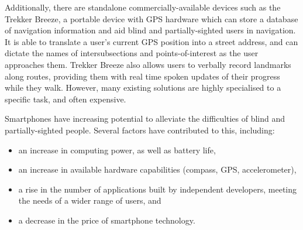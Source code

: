 \documentclass[10pt,twocolumn]{article}
\newcommand{\citep}[1]{}
\begin{document}
Additionally, there are standalone commercially-available devices such as the Trekker Breeze, a portable device with GPS hardware which can store a database of navigation information and aid blind and partially-sighted users in navigation\citep{trekker}. It is able to translate a user's current GPS position into a street address, and can dictate the names of intersubsections and points-of-interest as the user approaches them.  Trekker Breeze also allows users to verbally record landmarks along routes, providing them with real time spoken updates of their progress while they walk.  However, many existing solutions are highly specialised to a specific task, and often expensive. 

Smartphones have increasing potential to alleviate the difficulties of blind and partially-sighted people. Several factors have contributed to this, including:
\begin{itemize}
\item an increase in computing power, as well as battery life\citep{smartphones},
\item an increase in available hardware capabilities (compass, GPS, accelerometer),
\item a rise in the number of applications built by independent developers, meeting the needs of a wider range of users, and
\item a decrease in the price of smartphone technology.
\end{itemize}
\end{document}

